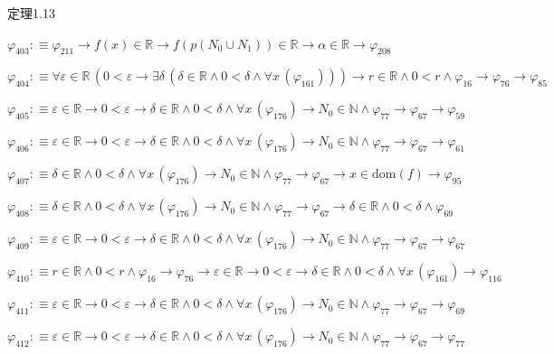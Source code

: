 \begin{fullproof}{定理1.13}
\begin{abbrevlist}
\item $\varphi_{403} :\equiv \varphi_{211} \to f(x) \in \mathbb{R} \to f(p(N_{0} \cup N_{1})) \in \mathbb{R} \to \alpha \in \mathbb{R} \to \varphi_{208}$
\item $\varphi_{404} :\equiv \forall \varepsilon \in \mathbb{R}\,(0 < \varepsilon \to \exists \delta\,(\delta \in \mathbb{R} \land 0 < \delta \land \forall x\,(\varphi_{161}))) \to r \in \mathbb{R} \land 0 < r \land \varphi_{16} \to \varphi_{76} \to \varphi_{85}$
\item $\varphi_{405} :\equiv \varepsilon \in \mathbb{R} \to 0 < \varepsilon \to \delta \in \mathbb{R} \land 0 < \delta \land \forall x\,(\varphi_{176}) \to N_{0} \in \mathbb{N} \land \varphi_{77} \to \varphi_{67} \to \varphi_{59}$
\item $\varphi_{406} :\equiv \varepsilon \in \mathbb{R} \to 0 < \varepsilon \to \delta \in \mathbb{R} \land 0 < \delta \land \forall x\,(\varphi_{176}) \to N_{0} \in \mathbb{N} \land \varphi_{77} \to \varphi_{67} \to \varphi_{61}$
\item $\varphi_{407} :\equiv \delta \in \mathbb{R} \land 0 < \delta \land \forall x\,(\varphi_{176}) \to N_{0} \in \mathbb{N} \land \varphi_{77} \to \varphi_{67} \to x \in \mathrm{dom}(f) \to \varphi_{95}$
\item $\varphi_{408} :\equiv \delta \in \mathbb{R} \land 0 < \delta \land \forall x\,(\varphi_{176}) \to N_{0} \in \mathbb{N} \land \varphi_{77} \to \varphi_{67} \to \delta \in \mathbb{R} \land 0 < \delta \land \varphi_{69}$
\item $\varphi_{409} :\equiv \varepsilon \in \mathbb{R} \to 0 < \varepsilon \to \delta \in \mathbb{R} \land 0 < \delta \land \forall x\,(\varphi_{176}) \to N_{0} \in \mathbb{N} \land \varphi_{77} \to \varphi_{67} \to \varphi_{67}$
\item $\varphi_{410} :\equiv r \in \mathbb{R} \land 0 < r \land \varphi_{16} \to \varphi_{76} \to \varepsilon \in \mathbb{R} \to 0 < \varepsilon \to \delta \in \mathbb{R} \land 0 < \delta \land \forall x\,(\varphi_{161}) \to \varphi_{116}$
\item $\varphi_{411} :\equiv \varepsilon \in \mathbb{R} \to 0 < \varepsilon \to \delta \in \mathbb{R} \land 0 < \delta \land \forall x\,(\varphi_{176}) \to N_{0} \in \mathbb{N} \land \varphi_{77} \to \varphi_{67} \to \varphi_{69}$
\item $\varphi_{412} :\equiv \varepsilon \in \mathbb{R} \to 0 < \varepsilon \to \delta \in \mathbb{R} \land 0 < \delta \land \forall x\,(\varphi_{176}) \to N_{0} \in \mathbb{N} \land \varphi_{77} \to \varphi_{67} \to \varphi_{77}$

\end{abbrevlist}
\end{fullproof}
